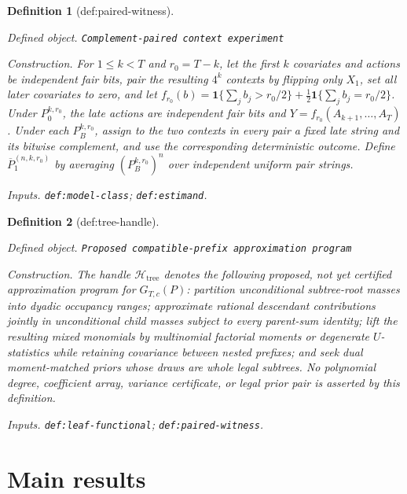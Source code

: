 \documentclass{article}
\newtheorem{definition}{Definition}
\begin{document}
\begin{definition}[def:paired-witness]\label{def:paired-witness}
\par\smallskip\noindent\emph{Defined object.} \texttt{Complement-\allowbreak{}paired context experiment}
\par\smallskip\noindent\emph{Construction.} For \(1\leq k<T\) and \(r_0=T-k\), let the first \(k\) covariates and actions be independent fair bits, pair the resulting \(4^k\) contexts by flipping only \(X_1\), set all later covariates to zero, and let \(f_{r_0}(b)=\mathbf 1\{\sum_jb_j>r_0/2\}+\frac12\mathbf 1\{\sum_jb_j=r_0/2\}\). Under \(P_0^{k,r_0}\), the late actions are independent fair bits and \(Y=f_{r_0}(A_{k+1},\ldots,A_T)\). Under each \(P_B^{k,r_0}\), assign to the two contexts in every pair a fixed late string and its bitwise complement, and use the corresponding deterministic outcome. Define \(\overline P_1^{(n,k,r_0)}\) by averaging \((P_B^{k,r_0})^n\) over independent uniform pair strings.
\par\smallskip\noindent\emph{Inputs.} \texttt{def:\allowbreak{}model-\allowbreak{}class}; \texttt{def:\allowbreak{}estimand}.
\end{definition}

\begin{definition}[def:tree-handle]\label{def:tree-handle}
\par\smallskip\noindent\emph{Defined object.} \texttt{Proposed compatible-\allowbreak{}prefix approximation program}
\par\smallskip\noindent\emph{Construction.} The handle \(\mathscr H_{\mathrm{tree}}\) denotes the following proposed, not yet certified approximation program for \(G_{T,c}(P)\): partition unconditional subtree-root masses into dyadic occupancy ranges; approximate rational descendant contributions jointly in unconditional child masses subject to every parent-sum identity; lift the resulting mixed monomials by multinomial factorial moments or degenerate \(U\)-statistics while retaining covariance between nested prefixes; and seek dual moment-matched priors whose draws are whole legal subtrees.  No polynomial degree, coefficient array, variance certificate, or legal prior pair is asserted by this definition.
\par\smallskip\noindent\emph{Inputs.} \texttt{def:\allowbreak{}leaf-\allowbreak{}functional}; \texttt{def:\allowbreak{}paired-\allowbreak{}witness}.
\end{definition}

\section{Main results}
\end{document}
